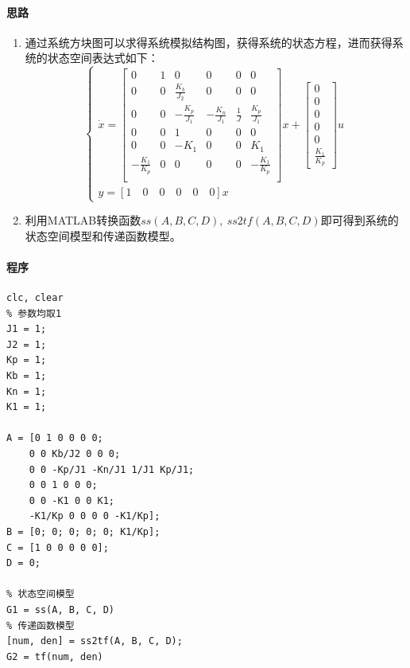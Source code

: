 \documentclass[UTF8]{article}
\begin{document}
\paragraph{思路}
\begin{enumerate}
    \item 通过系统方块图可以求得系统模拟结构图，获得系统的状态方程，进而获得系统的状态空间表达式如下：
$$
\begin{cases}
    \dot{x} = 
    \begin{bmatrix}
        0 & 1 & 0 & 0 & 0 & 0 \\
        0 & 0 & \frac{K_b}{J_2} & 0 & 0 & 0 \\
        0 & 0 & -\frac{K_p}{J_1} & -\frac{K_n}{J_1} & \frac{1}{J} & \frac{K_p}{J_1} \\
        0 & 0 & 1 & 0 & 0 & 0 \\
        0 & 0 & -K_1 & 0 & 0 & K_1 \\
        -\frac{K_1}{K_p} & 0 & 0 & 0 & 0 & -\frac{K_1}{K_p} \\
    \end{bmatrix}x + 
    \begin{bmatrix}
        0 \\
        0 \\
        0 \\
        0 \\
        0 \\
        \frac{K_1}{K_p}
    \end{bmatrix}u \\
    y = [1 \quad 0 \quad 0 \quad 0 \quad 0 \quad 0]x
\end{cases}
$$
    \item 利用MATLAB转换函数$ss(A, B, C, D),\ ss2tf(A, B, C, D)$即可得到系统的状态空间模型和传递函数模型。
\end{enumerate}

\paragraph{程序}
\begin{lstlisting}
clc, clear
% 参数均取1
J1 = 1;
J2 = 1;
Kp = 1;
Kb = 1;
Kn = 1;
K1 = 1;

A = [0 1 0 0 0 0;
    0 0 Kb/J2 0 0 0;
    0 0 -Kp/J1 -Kn/J1 1/J1 Kp/J1;
    0 0 1 0 0 0;
    0 0 -K1 0 0 K1;
    -K1/Kp 0 0 0 0 -K1/Kp];
B = [0; 0; 0; 0; 0; K1/Kp];
C = [1 0 0 0 0 0];
D = 0;

% 状态空间模型
G1 = ss(A, B, C, D)
% 传递函数模型
[num, den] = ss2tf(A, B, C, D);
G2 = tf(num, den)
\end{lstlisting}
\end{document}
